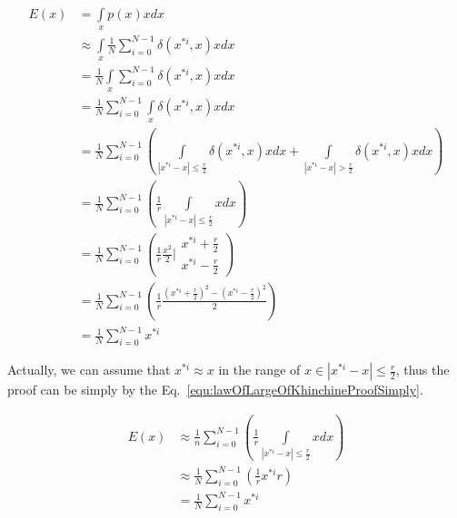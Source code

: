 \documentclass[runningheads,openany]{xhlPaper}
\begin{document}
\begin{equation}
\label{equ:lawOfLargeOfKhinchineProof}
\begin{aligned}
E\left( x \right) &= \int\limits_x {p\left( x \right)xdx} \\
 &\approx \int\limits_x {\frac{1}{N}\sum\limits_{i = 0}^{N - 1} {\delta \left( {{x^{*i}},x} \right)} xdx} \\
 &= \frac{1}{N}\int\limits_x {\sum\limits_{i = 0}^{N - 1} {\delta \left( {{x^{*i}},x} \right)} xdx} \\
 &= \frac{1}{N}\sum\limits_{i = 0}^{N - 1} {\int\limits_x {\delta \left( {{x^{*i}},x} \right)xdx} } \\
 &= \frac{1}{N}\sum\limits_{i = 0}^{N - 1} {\left( {\int\limits_{|{x^{*i}} - x| \le \frac{r}{2}} {\delta \left( {{x^{*i}},x} \right)xdx}  + \int\limits_{|{x^{*i}} - x| > \frac{r}{2}} {\delta \left( {{x^{*i}},x} \right)xdx} } \right)} \\
 &= \frac{1}{N}\sum\limits_{i = 0}^{N - 1} {\left( {\frac{1}{r}\int\limits_{|{x^{*i}} - x| \le \frac{r}{2}} {xdx} } \right)} \\
 &= \frac{1}{N}\sum\limits_{i = 0}^{N - 1} {\left( {\frac{1}{r}\frac{{{x^2}}}{2}|\begin{array}{*{20}{c}}
{{x^{*i}} + \frac{r}{2}}\\
{{x^{*i}} - \frac{r}{2}}
\end{array}} \right)} \\
 &= \frac{1}{N}\sum\limits_{i = 0}^{N - 1} {\left( {\frac{1}{r}\frac{{{{\left( {{x^{*i}} + \frac{r}{2}} \right)}^2} - {{\left( {{x^{*i}} - \frac{r}{2}} \right)}^2}}}{2}} \right)} \\
 &= \frac{1}{N}\sum\limits_{i = 0}^{N - 1} {{x^{*i}}} 
\end{aligned}
\end{equation}

Actually, we can assume that $x^{*i} \approx x$ in the range of $x \in {|{x^{*i}} - x| \le \frac{r}{2}}$, thus the proof can be simply by the Eq.~\ref{equ:lawOfLargeOfKhinchineProofSimply}.

\begin{equation}
\label{equ:lawOfLargeOfKhinchineProofSimply}
\begin{aligned}
E\left( x \right) &\approx \frac{1}{n}\sum\limits_{i = 0}^{N - 1} {\left( {\frac{1}{r}\int\limits_{|{x^{*i}} - x| \le \frac{r}{2}} {xdx} } \right)} \\
 &\approx \frac{1}{N}\sum\limits_{i = 0}^{N - 1} {\left( {\frac{1}{r}x^{*i}r} \right)} \\
 &= \frac{1}{N}\sum\limits_{i = 0}^{N - 1} {{x^{*i}}} 
\end{aligned}
\end{equation}
\end{document}
